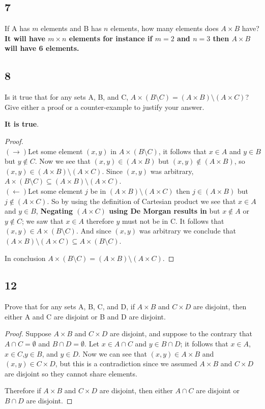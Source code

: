 \documentclass{article}
\begin{document}
\subsection{7}
If A has $m$ elements and B has $n$ elements, how many elements does $A \times B$ have?
\textbf{It will have $m \times n$ elements for instance if $m=2$ and $n=3$ then $A \times B$ will have 6 elements.}
\subsection{8}
Is it true that for any sets A, B, and C, $A \times (B \setminus C)=(A \times B)\setminus(A \times C)$?\\
Give either a proof or a counter-example to justify your answer.

\textbf{It is true}.

\begin{proof}$ $\\
$(\rightarrow)$Let some element $(x,y)$ in $A \times (B \setminus C )$, it follows that $x \in A$ and $y \in B$ but $y \notin C$. Now we see that $(x,y) \in (A \times B)$ but $(x,y)\notin (A \times B)$, so $(x,y)\in (A \times B)\setminus(A \times C)$. Since $(x,y)$ was arbitrary, $A \times (B \setminus C) \subseteq (A \times B)\setminus(A \times C)$.
\\
$(\leftarrow)$Let some element $j$ be in $(A \times B)\setminus(A \times C)$ then $j \in (A \times B)$ but $j \notin (A \times C)$. So by using the definition of Cartesian product we see that $x \in A$ and $y \in B$, \textbf{Negating $(A \times C)$ using De Morgan results in} but $x \notin A$ or $y \notin C$; we saw that $x \in A$ therefore $y$ must not be in C. It follows that $(x,y)\in A \times (B \setminus C)$. And since $(x,y)$ was arbitrary we conclude that $(A \times B) \setminus(A \times C)\subseteq A \times (B \setminus C)$.\


In conclusion $A \times (B \setminus C)=(A \times B)\setminus(A \times C)$.
\end{proof}
\subsection{12}
Prove that for any sets A, B, C, and D, if $A\times B$ and $C \times D$ are disjoint, then either A and C are disjoint or B and D are disjoint.
\begin{proof} 
Suppose  $A\times B$ and $C \times D$ are disjoint, and suppose to the contrary that $A \cap C = \emptyset$ and $B \cap D = \emptyset$. Let $x  \in A \cap C$ and $y \in B \cap D$; it follows that $x \in A$,$x \in C$,$y \in B$, and $y \in D$. Now we can see that $(x,y) \in A\times B$ and $(x,y) \in C \times D$, but this is a contradiction since we assumed $A\times B$ and $C \times D$ are disjoint so they
cannot share elements.

$ $\\ Therefore if $A\times B$ and $C \times D$ are disjoint, then either $A \cap C$ are disjoint or $B \cap D$ are disjoint.
\end{proof}
\end{document}
